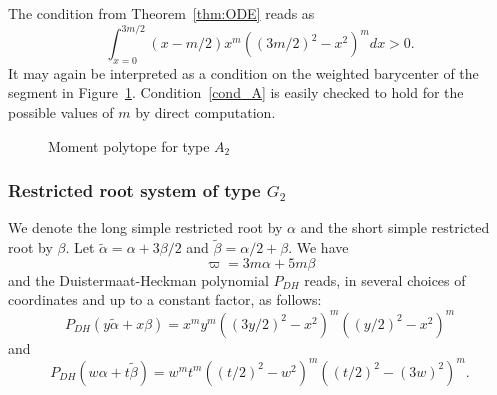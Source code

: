 \documentclass[10pt]{amsart}
\theoremstyle{plain}
\theoremstyle{definition}
\begin{document}
The condition from Theorem~\ref{thm:ODE} reads as
\begin{equation}
\label{cond_A}
\int_{x=0}^{3m/2}
(x-m/2)
x^m((3m/2)^2-x^2)^m dx
>0.
\end{equation}
It may again be interpreted as a condition on the weighted barycenter of the segment in
Figure~\ref{fig:A2pol}.
Condition~\eqref{cond_A} is easily checked to hold for the possible values
of $m$ by direct computation.

\begin{figure}
\smaller\centering
{}
\caption{Moment polytope for type $A_2$}
\label{fig:A2pol}
\end{figure}

\subsubsection{Restricted root system of type $G_2$}

We denote the long simple restricted root by $\alpha$
and the short simple restricted root by $\beta$.
Let $\tilde{\alpha}= \alpha+3\beta/2$ and
$\tilde{\beta}= \alpha/2+\beta$.
We have
\[ \varpi = 3m\alpha+5m\beta \]
and the Duistermaat-Heckman polynomial $P_{DH}$ reads, in several choices
of coordinates and up to a constant factor, as follows:
\begin{equation*}
P_{DH}(y\tilde{\alpha}+x\beta)=
x^my^m((3y/2)^2-x^2)^m((y/2)^2-x^2)^m
\end{equation*}
and
\begin{equation*}
P_{DH}(w\alpha+t\tilde{\beta})=
w^mt^m((t/2)^2-w^2)^m((t/2)^2-(3w)^2)^m.
\end{equation*}
\end{document}
